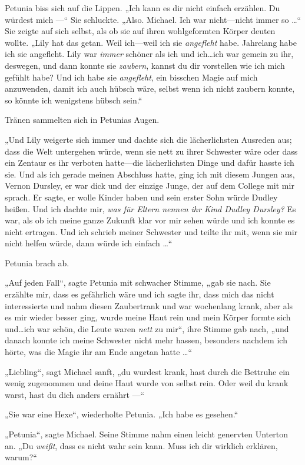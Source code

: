 {Petunia biss sich auf die Lippen. „Ich kann es dir nicht einfach erzählen. Du würdest mich —“ Sie schluckte. „Also. Michael. Ich war nicht—nicht immer so …“ Sie zeigte auf sich selbst, als ob sie auf ihren wohlgeformten Körper deuten wollte. „Lily hat das getan. Weil ich—weil ich sie \emph{angefleht} habe. Jahrelang habe ich sie angefleht. Lily war \emph{immer} schöner als ich und ich…ich war gemein zu ihr, deswegen, und dann konnte sie \emph{zaubern}, kannst du dir vorstellen wie ich mich gefühlt habe? Und ich habe sie \emph{angefleht}, ein bisschen Magie auf mich anzuwenden, damit ich auch hübsch wäre, selbst wenn ich nicht zaubern konnte, so könnte ich wenigstens hübsch sein.“

Tränen sammelten sich in Petunias Augen.

„Und Lily weigerte sich immer und dachte sich die lächerlichsten Ausreden aus; dass die Welt untergehen würde, wenn sie nett zu ihrer Schwester wäre oder dass ein Zentaur es ihr verboten hatte—die lächerlichsten Dinge und dafür hasste ich sie. Und als ich gerade meinen Abschluss hatte, ging ich mit diesem Jungen aus, Vernon Dursley, er war dick und der einzige Junge, der auf dem College mit mir sprach. Er sagte, er wolle Kinder haben und sein erster Sohn würde Dudley heißen. Und ich dachte mir, \emph{was für Eltern nennen ihr Kind Dudley Dursley?} Es war, als ob ich meine ganze Zukunft klar vor mir sehen würde und ich konnte es nicht ertragen. Und ich schrieb meiner Schwester und teilte ihr mit, wenn sie mir nicht helfen würde, dann würde ich einfach …“

Petunia brach ab.

„Auf jeden Fall“, sagte Petunia mit schwacher Stimme, „gab sie nach. Sie erzählte mir, dass es gefährlich wäre und ich sagte ihr, dass mich das nicht interessierte und nahm diesen Zaubertrank und war wochenlang krank, aber als es mir wieder besser ging, wurde meine Haut rein und mein Körper formte sich und…ich war schön, die Leute waren \emph{nett} zu mir“, ihre Stimme gab nach, „und danach konnte ich meine Schwester nicht mehr hassen, besonders nachdem ich hörte, was die Magie ihr am Ende angetan hatte …“

„Liebling“, sagt Michael sanft, „du wurdest krank, hast durch die Bettruhe ein wenig zugenommen und deine Haut wurde von selbst rein. Oder weil du krank warst, hast du dich anders ernährt —“

„Sie war eine Hexe“, wiederholte Petunia. „Ich habe es gesehen.“

„Petunia“, sagte Michael. Seine Stimme nahm einen leicht genervten Unterton an. „Du \emph{weißt}, dass es nicht wahr sein kann. Muss ich dir wirklich erklären, warum?“

}
